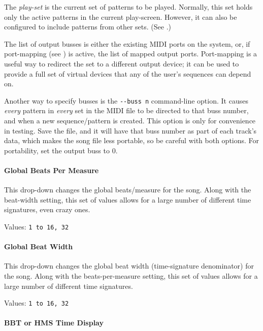 \documentclass[
 11pt,
 twoside,
 a4paper,
 final                                 %
]{article}
\begin{document}
   The \textsl{play-set} is the current set of patterns to be played.
   Normally, this set holds only the active patterns in the current
   play-screen.
   However, it can also be configured to include patterns from other sets.
   (See .)

   The list of
   output busses is either the existing MIDI ports on the system, or,
   if port-mapping (see ) is active, the list
   of mapped output ports.
   Port-mapping is a useful way to redirect the set to a different output
   device; it can be used to provide a full set of virtual devices that any of
   the user's sequences can depend on.

   Another way to specify busses is the
   \texttt{-{}-buss n} command-line option.
   It causes \textsl{every} pattern in \textsl{every} set in the MIDI
   file to be directed to that buss number, and when a new
   sequence/pattern is created.  This option is only
   for convenience in testing.  Save the file, and it will
   have that buss number as part of each track's data, which makes the song
   file less portable, so be careful with both options.
   For portability, set the output buss to 0.

\paragraph{Global Beats Per Measure}
\label{paragraph:introduction_global_beats_per_measure}

   This drop-down changes the global beats/measure for the song.
   Along with the beat-width setting, this set of values allows
   for a large number of different time signatures, even crazy ones.

   Values: \texttt{1 to 16, 32}

\paragraph{Global Beat Width}
\label{paragraph:introduction_global_beat_width}

   This drop-down changes the global beat width (time-signature denominator)
   for the song.
   Along with the beats-per-measure setting, this set of values allows
   for a large number of different time signatures.

   Values: \texttt{1 to 16, 32}

\paragraph{BBT or HMS Time Display}
\label{paragraph:introduction_time_display}
\end{document}

